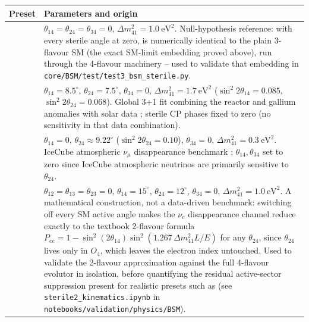 \begin{implbox}
\begin{center}
\small
\begin{tabular}{@{}ll@{}}
\toprule
Preset & Parameters and origin \\
\midrule
\parbox[t]{3.2cm}{} &
  \parbox[t]{9.4cm}{$\theta_{14}=\theta_{24}=\theta_{34}=0$,
  $\Delta m^2_{41}=1.0\ \mathrm{eV^2}$. Null-hypothesis reference: with
  every sterile angle at zero,  is numerically
  identical to the plain 3-flavour SM (the exact SM-limit embedding proved
  above), run through the 4-flavour machinery -- used to validate that
  embedding in \texttt{core/BSM/test/test3\_bsm\_sterile.py}.} \\[26pt]
\parbox[t]{3.2cm}{} &
  \parbox[t]{9.4cm}{$\theta_{14}=8.5^\circ$, $\theta_{24}=7.5^\circ$,
  $\theta_{34}=0$, $\Delta m^2_{41}=1.7\ \mathrm{eV^2}$
  ($\sin^2 2\theta_{14}=0.085$, $\sin^2 2\theta_{24}=0.068$). Global 3+1
  fit combining the reactor and gallium anomalies with solar data
  \parencite{GariazzoGiuntiLavederLi2017}; sterile CP phases fixed to zero
  (no sensitivity in that data combination).} \\[30pt]
\parbox[t]{3.2cm}{} &
  \parbox[t]{9.4cm}{$\theta_{14}=0$, $\theta_{24}\approx9.22^\circ$
  ($\sin^2 2\theta_{24}=0.10$), $\theta_{34}=0$,
  $\Delta m^2_{41}=0.3\ \mathrm{eV^2}$. IceCube atmospheric $\nu_\mu$
  disappearance benchmark \parencite{IceCube2020SterileNumuDisappearance};
  $\theta_{14},\theta_{34}$ set to zero since IceCube atmospheric neutrinos
  are primarily sensitive to $\theta_{24}$.} \\[26pt]
\parbox[t]{3.2cm}{} &
  \parbox[t]{9.4cm}{$\theta_{12}=\theta_{13}=\theta_{23}=0$,
  $\theta_{14}=15^\circ$, $\theta_{24}=12^\circ$, $\theta_{34}=0$,
  $\Delta m^2_{41}=1.0\ \mathrm{eV^2}$. A mathematical construction, not a
  data-driven benchmark: switching off every SM active angle makes the
  $\nu_e$ disappearance channel reduce exactly to the textbook 2-flavour
  formula $P_{ee}=1-\sin^2(2\theta_{14})\sin^2(1.267\,\Delta m^2_{41}L/E)$
  for any $\theta_{24}$, since $\theta_{24}$ lives only in $O_4$, which
  leaves the electron index untouched. Used to validate the 2-flavour
  approximation against the full 4-flavour evolutor in isolation, before
  quantifying the residual active-sector suppression present for realistic
  presets such as  (see
  \texttt{sterile2\_kinematics.ipynb} in
  \texttt{notebooks/validation/physics/BSM}).} \\[42pt]
\bottomrule
\end{tabular}
\end{center}
\end{implbox}

